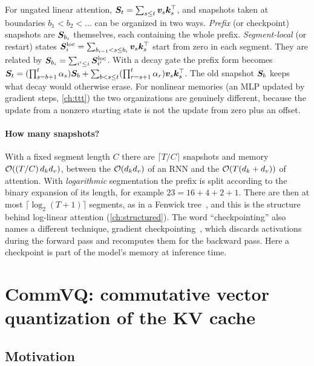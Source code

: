 For ungated linear attention, $\bm{S}_t=\sum_{s\le t}\bm{v}_s\bm{k}_s^{\top}$, and snapshots taken at boundaries
$b_1<b_2<\dots$ can be organized in two ways. \emph{Prefix} (or checkpoint) snapshots are
$\bm{S}_{b_i}$ themselves, each containing the whole prefix. \emph{Segment-local} (or restart) states
$\bm{S}^{\text{loc}}_i=\sum_{b_{i-1}<s\le b_i}\bm{v}_s\bm{k}_s^{\top}$ start from zero in each segment. They are related by
$\bm{S}_{b_i}=\sum_{i'\le i}\bm{S}^{\text{loc}}_{i'}$. With a decay gate the prefix form becomes
$\bm{S}_t=(\prod_{s=b+1}^{t}\alpha_s)\bm{S}_b+\sum_{b<s\le t}(\prod_{r=s+1}^t\alpha_r)\bm{v}_s\bm{k}_s^{\top}$. The
old snapshot $\bm{S}_b$ keeps what decay would otherwise erase. For nonlinear memories (an MLP updated by
gradient steps, \cref{ch:ttt}) the two organizations are genuinely different, because the update from
a nonzero starting state is not the update from zero plus an offset.

\paragraph{How many snapshots?} With a fixed segment length $C$ there are $\lceil T/C\rceil$ snapshots
and memory $\mathcal{O}((T/C)\,d_kd_v)$, between the $\mathcal{O}(d_kd_v)$ of an RNN and the $\mathcal{O}(T(d_k+d_v))$ of
attention. With \emph{logarithmic} segmentation the prefix is split according to the binary expansion
of its length, for example $23=16+4+2+1$. There are then at most $\lceil\log_2(T+1)\rceil$ segments, as
in a Fenwick tree~\citep{c07-fenwick1994}, and this is the structure behind log-linear attention
\citep{guo2025loglinear} (\cref{ch:structured}). The word ``checkpointing'' also names a different
technique, gradient checkpointing~\citep{c01-chen2016checkpoint}, which discards activations during
the forward pass and recomputes them for the backward pass. Here a checkpoint is part of the model's
memory at inference time.

\section{CommVQ: commutative vector quantization of the KV cache}\label{sec:c13-commvq}

\subsection{Motivation}

